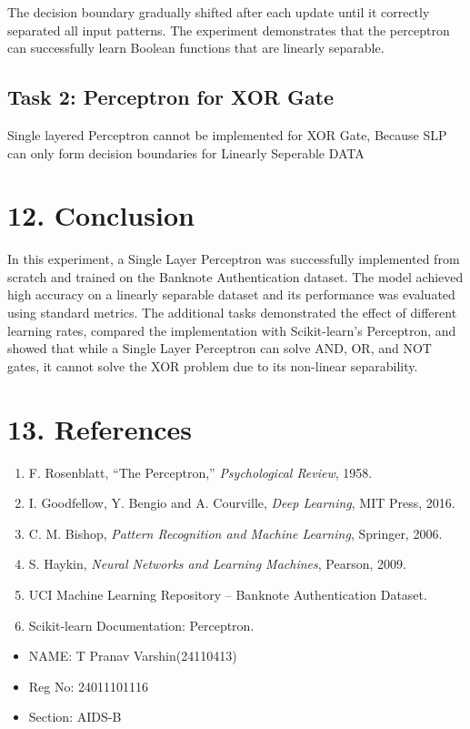 \documentclass{article}
\begin{document}


The decision boundary gradually shifted after each update until it correctly separated all input patterns.
The experiment demonstrates that the perceptron can successfully learn Boolean functions that are linearly separable.

\vspace{3mm}

\subsection*{Task 2: Perceptron for XOR Gate}
Single layered Perceptron cannot be implemented for XOR Gate, Because SLP can only form decision boundaries for Linearly Seperable DATA

\section*{12. Conclusion}
In this experiment, a Single Layer Perceptron was successfully implemented from scratch and trained on the Banknote Authentication dataset. The model achieved high accuracy on a linearly separable dataset and its performance was evaluated using standard metrics. The additional tasks demonstrated the effect of different learning rates, compared the implementation with Scikit-learn's Perceptron, and showed that while a Single Layer Perceptron can solve AND, OR, and NOT gates, it cannot solve the XOR problem due to its non-linear separability.

\section*{13. References}
\begin{enumerate}
\item F. Rosenblatt, ``The Perceptron,'' \emph{Psychological Review}, 1958.
\item I. Goodfellow, Y. Bengio and A. Courville, \emph{Deep Learning}, MIT Press, 2016.
\item C. M. Bishop, \emph{Pattern Recognition and Machine Learning}, Springer, 2006.
\item S. Haykin, \emph{Neural Networks and Learning Machines}, Pearson, 2009.
\item UCI Machine Learning Repository -- Banknote Authentication Dataset.
\item Scikit-learn Documentation: Perceptron.
\end{enumerate}
\vspace{10mm}
\begin{itemize}
    \item NAME: T Pranav Varshin(24110413)
    \item Reg No: 24011101116
    \item Section: AIDS-B
\end{itemize}
\end{document}

